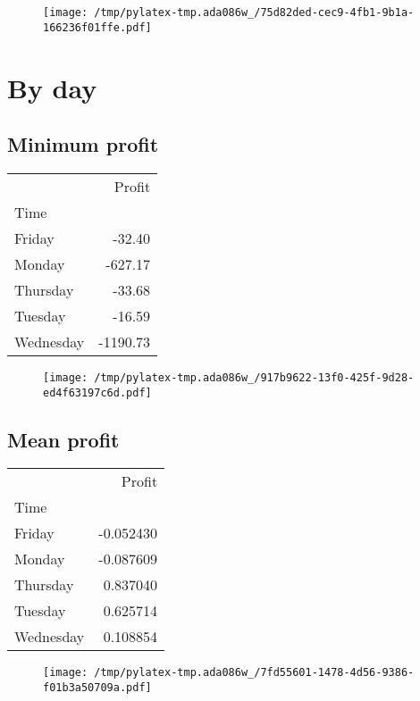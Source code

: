 \documentclass{article}%
\begin{document}
\begin{figure}[htbp]%
\centering%
\texttt{[image: /tmp/pylatex-tmp.ada086w\_/75d82ded-cec9-4fb1-9b1a-166236f01ffe.pdf]}%
\end{figure}

%
\newpage %
\section{By day}%
\label{sec:Byday}%
\subsection{Minimum profit }%
\label{subsec:Minimumprofit}%
\begin{tabular}{lr}
\toprule
{} &   Profit \\
Time      &          \\
\midrule
Friday    &   -32.40 \\
Monday    &  -627.17 \\
Thursday  &   -33.68 \\
Tuesday   &   -16.59 \\
Wednesday & -1190.73 \\
\bottomrule
\end{tabular}
%


\begin{figure}[htbp]%
\centering%
\texttt{[image: /tmp/pylatex-tmp.ada086w\_/917b9622-13f0-425f-9d28-ed4f63197c6d.pdf]}%
\end{figure}

%
\newpage %
\subsection{Mean profit }%
\label{subsec:Meanprofit}%
\begin{tabular}{lr}
\toprule
{} &    Profit \\
Time      &           \\
\midrule
Friday    & -0.052430 \\
Monday    & -0.087609 \\
Thursday  &  0.837040 \\
Tuesday   &  0.625714 \\
Wednesday &  0.108854 \\
\bottomrule
\end{tabular}
%


\begin{figure}[htbp]%
\centering%
\texttt{[image: /tmp/pylatex-tmp.ada086w\_/7fd55601-1478-4d56-9386-f01b3a50709a.pdf]}%
\end{figure}
\end{document}
